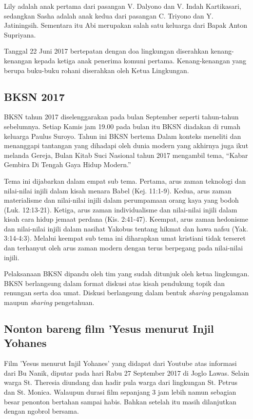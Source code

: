 Lily adalah anak pertama dari pasangan V. Dalyono dan V. Indah Kartikasari, sedangkan Sasha adalah anak kedua dari pasangan C. Triyono dan Y. Jatiningsih. Sementara itu Abi merupakan salah satu keluarga dari Bapak Anton Supriyana.

Tanggal 22 Juni 2017 bertepatan dengan doa lingkungan diserahkan kenang-kenangan kepada ketiga anak penerima komuni pertama. Kenang-kenangan yang berupa buku-buku rohani diserahkan oleh Ketua Lingkungan.

\subsection*{BKSN 2017}
BKSN tahun 2017 diselenggarakan pada bulan September seperti tahun-tahun sebelumnya. Setiap Kamis jam 19.00 pada bulan itu BKSN diadakan di rumah keluarga Paulus Suroyo. Tahun ini BKSN bertema Dalam konteks meneliti dan menanggapi tantangan yang dihadapi oleh dunia modern yang akhirnya juga ikut melanda Gereja, Bulan Kitab Suci Nasional tahun 2017 mengambil tema, “Kabar Gembira Di Tengah Gaya Hidup Modern.” 

Tema ini dijabarkan dalam empat sub tema. Pertama, arus zaman teknologi dan nilai-nilai injili dalam kisah menara Babel (Kej. 11:1-9). Kedua, arus zaman materialisme dan nilai-nilai injili dalam perumpamaan orang kaya yang bodoh (Luk. 12:13-21). Ketiga, arus zaman individualisme dan nilai-nilai injili dalam kisah cara hidup jemaat perdana (Kis. 2:41-47). Keempat, arus zaman hedonisme dan nilai-nilai injili dalam nasihat Yakobus tentang hikmat dan hawa nafsu (Yak. 3:14-4:3). Melalui keempat sub tema ini diharapkan umat kristiani tidak terseret dan terhanyut oleh arus zaman modern dengan terus berpegang pada nilai-nilai injili.

Pelaksanaan BKSN dipandu oleh tim yang sudah ditunjuk oleh ketua lingkungan. BKSN berlangsung dalam format diskusi atas kisah pendukung topik dan renungan serta doa umat. Diskusi berlangsung dalam bentuk \textit{sharing} pengalaman maupun \textit{sharing} pengetahuan.

\subsection*{Nonton bareng film 'Yesus menurut Injil Yohanes}

Film 'Yesus menurut Injil Yohanes' yang didapat dari Youtube atas informasi dari Bu Nanik, diputar pada hari Rabu 27 September 2017 di Joglo Lawas. Selain warga St. Theresia diundang dan hadir pula warga dari lingkungan St. Petrus dan St. Monica. Walaupun durasi film sepanjang 3 jam lebih namun sebagian besar penonton bertahan sampai habis. Bahkan setelah itu masih dilanjutkan dengan ngobrol bersama. 


